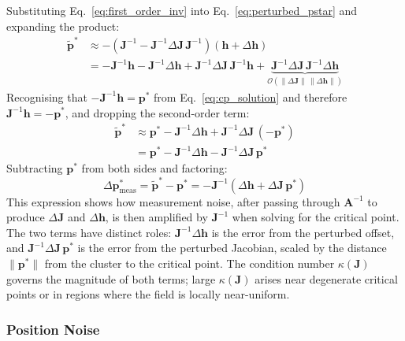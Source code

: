 \documentclass[lettersize,journal]{IEEEtran}
\begin{document}
Substituting Eq.~\eqref{eq:first_order_inv} into Eq.~\eqref{eq:perturbed_pstar} and expanding the product:
\begin{align}
    \tilde{\mathbf{p}}^* &\approx -\left(\mathbf{J}^{-1} - \mathbf{J}^{-1}\Delta\mathbf{J}\,\mathbf{J}^{-1}\right)\!\left(\mathbf{h} + \Delta\mathbf{h}\right) \nonumber \\
    &= -\mathbf{J}^{-1}\mathbf{h} - \mathbf{J}^{-1}\Delta\mathbf{h} + \mathbf{J}^{-1}\Delta\mathbf{J}\,\mathbf{J}^{-1}\mathbf{h} + \underbrace{\mathbf{J}^{-1}\Delta\mathbf{J}\,\mathbf{J}^{-1}\Delta\mathbf{h}}_{\mathcal{O}(\|\Delta\mathbf{J}\|\,\|\Delta\mathbf{h}\|)}
    \label{eq:expand_full}
\end{align}
Recognising that $-\mathbf{J}^{-1}\mathbf{h} = \mathbf{p}^*$ from Eq.~\eqref{eq:cp_solution} and therefore $\mathbf{J}^{-1}\mathbf{h} = -\mathbf{p}^*$, and dropping the second-order term:
\begin{align}
    \tilde{\mathbf{p}}^* &\approx \mathbf{p}^* - \mathbf{J}^{-1}\Delta\mathbf{h} + \mathbf{J}^{-1}\Delta\mathbf{J}\,(-\mathbf{p}^*) \nonumber \\
    &= \mathbf{p}^* - \mathbf{J}^{-1}\Delta\mathbf{h} - \mathbf{J}^{-1}\Delta\mathbf{J}\,\mathbf{p}^*
    \label{eq:regroup}
\end{align}
Subtracting $\mathbf{p}^*$ from both sides and factoring:
\begin{equation}
    \Delta\mathbf{p}^*_{\text{meas}} = \tilde{\mathbf{p}}^* - \mathbf{p}^* = -\mathbf{J}^{-1}\!\left(\Delta\mathbf{h} + \Delta\mathbf{J}\,\mathbf{p}^*\right)
    \label{eq:dp_meas}
\end{equation}
This expression shows how measurement noise, after passing through $\mathbf{A}^{-1}$ to produce $\Delta\mathbf{J}$ and $\Delta\mathbf{h}$, is then amplified by $\mathbf{J}^{-1}$ when solving for the critical point. The two terms have distinct roles: $\mathbf{J}^{-1}\Delta\mathbf{h}$ is the error from the perturbed offset, and $\mathbf{J}^{-1}\Delta\mathbf{J}\,\mathbf{p}^*$ is the error from the perturbed Jacobian, scaled by the distance $\|\mathbf{p}^*\|$ from the cluster to the critical point. The condition number $\kappa(\mathbf{J})$ governs the magnitude of both terms; large $\kappa(\mathbf{J})$ arises near degenerate critical points or in regions where the field is locally near-uniform.

\subsubsection{Position Noise}
\end{document}
